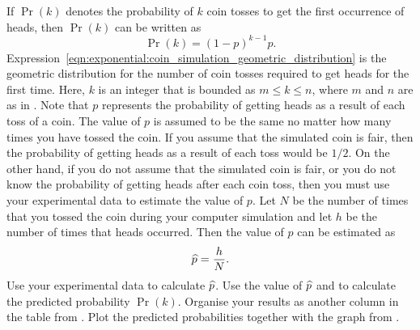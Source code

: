 \documentclass[a4paper,oneside,12pt]{article}
\begin{document}
\begin{problem}
\begin{packedenum}
  \item\label{subprob:exponential:coin_simulation_estimate_probability}
    If $\Pr(k)$ denotes the probability of $k$ coin tosses to get the
    first occurrence of heads, then $\Pr(k)$ can be written as
    \begin{equation}
    \label{eqn:exponential:coin_simulation_geometric_distribution}
    \Pr(k)
    =
    (1 - p)^{k-1} p.
    \end{equation}
    Expression~\eqref{eqn:exponential:coin_simulation_geometric_distribution}
    is the geometric distribution for the number of coin tosses
    required to get heads for the first time.  Here, $k$ is an integer
    that is bounded as $m \leq k \leq n$, where $m$ and $n$ are as
    in .
    Note that $p$ represents the probability of getting heads as a
    result of each toss of a coin.  The value of $p$ is assumed to be
    the same no matter how many times you have tossed the coin.  If
    you assume that the simulated coin is fair, then the probability
    of getting heads as a result of each toss would be $1 / 2$.  On
    the other hand, if you do not assume that the simulated coin is
    fair, or you do not know the probability of getting heads after
    each coin toss, then you must use your experimental data to
    estimate the value of $p$.  Let $N$ be the number of times that
    you tossed the coin during your computer simulation and let $h$ be
    the number of times that heads occurred.  Then the value of $p$
    can be estimated as
    \begin{equation}
    \label{eqn:exponential:coin_simulation_estimate_p}
    \widehat{p}
    =
    \frac{h}{N}.
    \end{equation}
    Use your experimental data to calculate $\widehat{p}$.  Use the value of
    $\widehat{p}$ and
    to calculate the predicted probability $\Pr(k)$.  Organise your
    results as another column in the table
    from .
    Plot the predicted probabilities together with the graph
    from .


\end{packedenum}
\end{problem}
\end{document}
